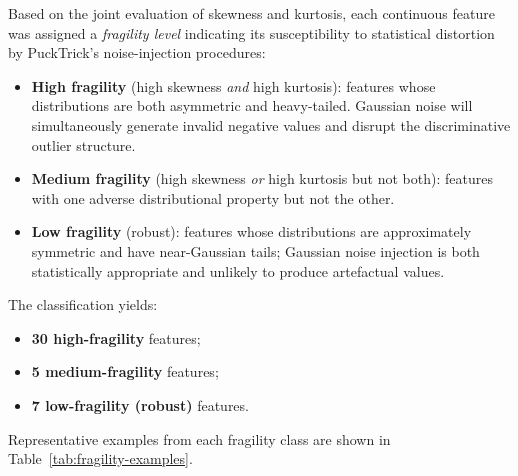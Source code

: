 Based on the joint evaluation of skewness and kurtosis, each continuous feature
was assigned a \emph{fragility level} indicating its susceptibility to
statistical distortion by PuckTrick's noise-injection procedures:

\begin{itemize}
  \item \textbf{High fragility} (high skewness \emph{and} high kurtosis):
        features whose distributions are both asymmetric and heavy-tailed.
        Gaussian noise will simultaneously generate invalid negative values and
        disrupt the discriminative outlier structure.
  \item \textbf{Medium fragility} (high skewness \emph{or} high kurtosis but
        not both): features with one adverse distributional property but not
        the other.
  \item \textbf{Low fragility} (robust): features whose distributions are
        approximately symmetric and have near-Gaussian tails; Gaussian noise
        injection is both statistically appropriate and unlikely to produce
        artefactual values.
\end{itemize}

The classification yields:
\begin{itemize}
  \item \textbf{30 high-fragility} features;
  \item \textbf{5 medium-fragility} features;
  \item \textbf{7 low-fragility (robust)} features.
\end{itemize}

Representative examples from each fragility class are shown in
Table~\ref{tab:fragility-examples}.

